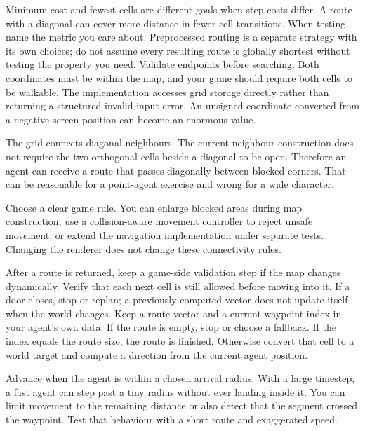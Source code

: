 \documentclass[11pt,a4paper]{article}
\begin{document}
Minimum cost and fewest cells are different goals when step costs differ. A route with a diagonal can cover more distance in fewer cell transitions. When testing, name the metric you care about. Preprocessed routing is a separate strategy with its own choices; do not assume every resulting route is globally shortest without testing the property you need.
Validate endpoints before searching. Both coordinates must be within the map, and your game should require both cells to be walkable. The implementation accesses grid storage directly rather than returning a structured invalid-input error. An unsigned coordinate converted from a negative screen position can become an enormous value.

The grid connects diagonal neighbours. The current neighbour construction does not require the two orthogonal cells beside a diagonal to be open. Therefore an agent can receive a route that passes diagonally between blocked corners. That can be reasonable for a point-agent exercise and wrong for a wide character.

Choose a clear game rule. You can enlarge blocked areas during map construction, use a collision-aware movement controller to reject unsafe movement, or extend the navigation implementation under separate tests. Changing the renderer does not change these connectivity rules.

After a route is returned, keep a game-side validation step if the map changes dynamically. Verify that each next cell is still allowed before moving into it. If a door closes, stop or replan; a previously computed vector does not update itself when the world changes.
Keep a route vector and a current waypoint index in your agent's own data. If the route is empty, stop or choose a fallback. If the index equals the route size, the route is finished. Otherwise convert that cell to a world target and compute a direction from the current agent position.

Advance when the agent is within a chosen arrival radius. With a large timestep, a fast agent can step past a tiny radius without ever landing inside it. You can limit movement to the remaining distance or also detect that the segment crossed the waypoint. Test that behaviour with a short route and exaggerated speed.
\end{document}
